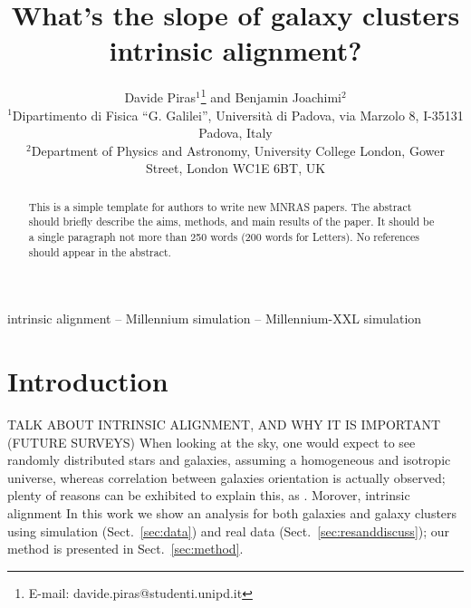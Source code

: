 \documentclass[a4paper,fleqn,usenatbib]{mnras}
\title[Slope of intrinsic alignment vs mass signal]{What's the slope of galaxy clusters intrinsic alignment?}
\author[D. Piras et al.]{
Davide Piras$^{1}$\thanks{E-mail: davide.piras@studenti.unipd.it}
and Benjamin Joachimi$^{2}$
\\
$^{1}$Dipartimento di Fisica ``G. Galilei'', Universit\`{a} di Padova, via Marzolo 8, I-35131 Padova, Italy\\
$^{2}$Department of Physics and Astronomy, University College London, Gower Street, London WC1E 6BT, UK
}
\begin{document}
\label{firstpage}
\pagerange{\pageref{firstpage}--\pageref{lastpage}}
\maketitle

\begin{abstract}
This is a simple template for authors to write new MNRAS papers.
The abstract should briefly describe the aims, methods, and main results of the paper.
It should be a single paragraph not more than 250 words (200 words for Letters).
No references should appear in the abstract.
\end{abstract}

\begin{keywords}
intrinsic alignment -- Millennium simulation -- Millennium-XXL simulation
\end{keywords}



\section{Introduction}
\label{sec:intro}
TALK ABOUT INTRINSIC ALIGNMENT, AND WHY IT IS IMPORTANT (FUTURE SURVEYS)
When looking at the sky, one would expect to see randomly distributed stars and galaxies, assuming a homogeneous and isotropic universe, whereas correlation between galaxies orientation is actually observed; plenty of reasons can be exhibited to explain this, as . Morover, intrinsic alignment  
In this work we show an analysis for both galaxies and galaxy clusters using simulation (Sect.~\ref{sec:data}) and real data (Sect.~\ref{sec:resanddiscuss}); our method is presented in Sect.~\ref{sec:method}.
\end{document}
